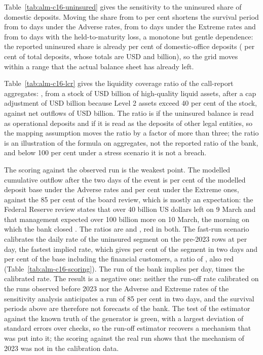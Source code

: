 
Table~\ref{tab:alm-c16-uninsured} gives the sensitivity to the uninsured share of domestic deposits. Moving the share from \almLShareLow{} to \almLShareHigh{} per cent shortens the survival period from \almLSensAdvLow{} to \almLSensAdvHigh{} days under the Adverse rates, from \almLSensExtLow{} to \almLSensExtHigh{} days under the Extreme rates and from \almLSensHtmLow{} to \almLSensHtmHigh{} days with the held-to-maturity loss, a monotone but gentle dependence: the reported uninsured share is already \almLUnaDom{} per cent of domestic-office deposits (\almLUnaDep{} per cent of total deposits, whose totals are USD \almLDepDom{} and \almLDep{} billion), so the grid moves within a range that the actual balance sheet has already left.

Table~\ref{tab:alm-c16-lcr} gives the liquidity coverage ratio of the call-report aggregates: \almLLcr{}, from a stock of USD \almLHqla{} billion of high-quality liquid assets, after a cap adjustment of USD \almLAdjCap{} billion because Level 2 assets exceed 40 per cent of the stock, against net outflows of USD \almLNetOut{} billion. The ratio is \almLLcrOperational{} if the uninsured balance is read as operational deposits and \almLLcrLegal{} if it is read as the deposits of other legal entities, so the mapping assumption moves the ratio by a factor of more than three; the ratio is an illustration of the formula on aggregates, not the reported ratio of the bank, and below 100 per cent under a stress scenario it is not a breach.

The scoring against the observed run is the weakest point. The modelled cumulative outflow after the two days of the event is \almLAdvTwoDay{} per cent of the modelled deposit base under the Adverse rates and \almLExtTwoDay{} per cent under the Extreme ones, against the 85 per cent of the board review, which is mostly an expectation: the Federal Reserve review states that over 40 billion US dollars left on 9 March and that management expected over 100 billion more on 10 March, the morning on which the bank closed \citep{alm:fed2023}. The ratios are \almLAdvRatio{} and \almLExtRatio{}, red in both. The fast-run scenario calibrates the daily rate of the uninsured segment on the pre-2023 rows at \almLFastRate{} per day, the fastest implied rate, which gives \almLFastTwoDaySegment{} per cent of the segment in two days and \almLFastTwoDay{} per cent of the base including the financial customers, a ratio of \almLFastRatio{}, also red (Table~\ref{tab:alm-c16-scoring}). The run of the bank implies \almLSvbImpliedRate{} per day, \almLSvbRateRatio{} times the calibrated rate. The result is a negative one: neither the run-off rate calibrated on the runs observed before 2023 nor the Adverse and Extreme rates of the sensitivity analysis anticipates a run of 85 per cent in two days, and the survival periods above are therefore not forecasts of the bank. The test of the estimator against the known truth of the generator is green, with a largest deviation of \almLGenZ{} standard errors over \almLGenN{} checks, so the run-off estimator recovers a mechanism that was put into it; the scoring against the real run shows that the mechanism of 2023 was not in the calibration data.
